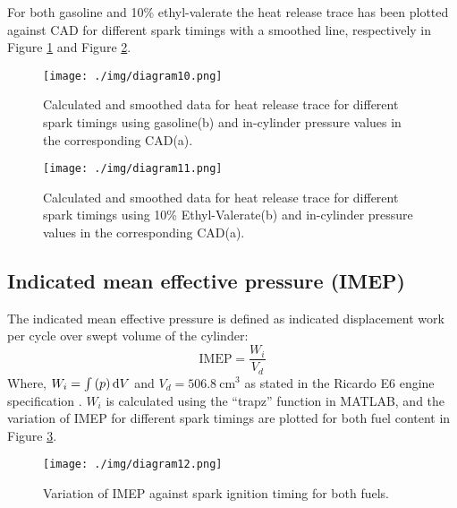 For both gasoline and 10\% ethyl-valerate the heat release trace has been plotted against CAD  for different spark timings with a smoothed line, respectively in Figure \ref{q1-f3} and Figure \ref{q1-f4}.
\begin{figure}[H]
    \centering
    \texttt{[image: ./img/diagram10.png]}
    \caption{Calculated and smoothed data for heat release trace for different spark timings using gasoline(b) and in-cylinder pressure values in the corresponding CAD(a).}
    \label{q1-f3}
\end{figure}
\begin{figure}[H]
    \centering
    \texttt{[image: ./img/diagram11.png]}
    \caption{Calculated and smoothed data for heat release trace for different spark timings using 10\% Ethyl-Valerate(b) and in-cylinder pressure values in the corresponding CAD(a).}
    \label{q1-f4}
\end{figure}
\subsection*{Indicated mean effective pressure (IMEP)}
The indicated mean effective pressure is defined as indicated displacement work per cycle over swept volume of the cylinder:
\begin{equation}
    \textrm{IMEP} = \frac{W_i}{V_d}
\end{equation}
Where,
$W_i = \int \left(p\right)\dif V$ and $V_d = \SI{506.8}{\centi\meter\cubed}$ as stated in the Ricardo E6 engine specification \cite{r0}. $W_i$ is calculated using the “trapz” function in MATLAB, and the variation of IMEP for different spark timings are plotted for both fuel content in Figure \ref{q1-f5}.
\begin{figure}[H]
    \centering
    \texttt{[image: ./img/diagram12.png]}
    \caption{Variation of IMEP against spark ignition timing for both fuels.}
    \label{q1-f5}
\end{figure}

